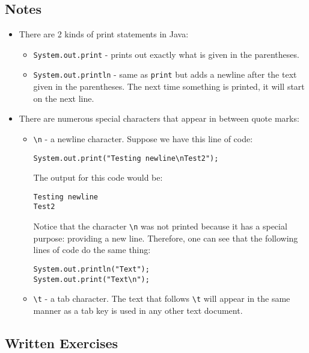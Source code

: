 \subsection{Notes}
\begin{itemize}
\item There are 2 kinds of print statements in Java:
\begin{itemize}
\item \verb|System.out.print| - prints out exactly what is given in the parentheses.
\item \verb|System.out.println| - same as \verb|print| but adds a newline after the text given in the parentheses. The next time something is printed, it will start on the next line.
\end{itemize}

\item There are numerous special characters that appear in between quote marks:
\begin{itemize}
\item \verb|\n| - a newline character. Suppose we have this line of code:
\begin{lstlisting}
System.out.print("Testing newline\nTest2");
\end{lstlisting}
The output for this code would be:
\begin{verbatim}
Testing newline
Test2
\end{verbatim}
Notice that the character \verb|\n| was not printed because it has a special purpose: providing a new line. Therefore, one can see that the following lines of code do the same thing:
\begin{verbatim}
System.out.println("Text");
System.out.print("Text\n");
\end{verbatim}
\item \verb|\t| - a tab character. The text that follows \verb|\t| will appear in the same manner as a tab key is used in any other text document.
\end{itemize}
\end{itemize}

\subsection{Written Exercises}

